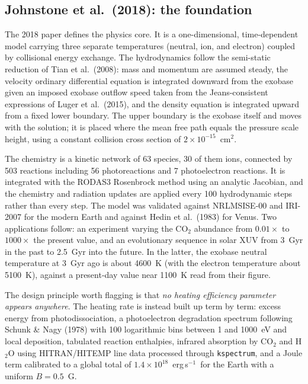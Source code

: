 \documentclass{my_memo}
\newcommand{\ergs}{erg\,s$^{-1}$}
\begin{document}
\subsection{Johnstone et al.\ (2018): the foundation}

The 2018 paper defines the physics core. It is a one-dimensional, time-dependent model carrying
three separate temperatures (neutral, ion, and electron) coupled by collisional energy
exchange. The hydrodynamics follow the semi-static reduction of Tian et al.\ (2008): mass and
momentum are assumed steady, the velocity ordinary differential equation is integrated downward
from the exobase given an imposed exobase outflow speed taken from the Jeans-consistent
expressions of Luger et al.\ (2015), and the density equation is integrated upward from a fixed
lower boundary. The upper boundary is the exobase itself and moves with the solution; it is
placed where the mean free path equals the pressure scale height, using a constant collision
cross section of $2\times10^{-15}$~cm$^{2}$.

The chemistry is a kinetic network of 63 species, 30 of them ions, connected by 503 reactions
including 56 photoreactions and 7 photoelectron reactions. It is integrated with the RODAS3
Rosenbrock method using an analytic Jacobian, and the chemistry and radiation updates are applied
every 100 hydrodynamic steps rather than every step. The model was validated against NRLMSISE-00
and IRI-2007 for the modern Earth and against Hedin et al.\ (1983) for Venus. Two applications
follow: an experiment varying the CO$_2$ abundance from $0.01\times$ to $1000\times$ the present
value, and an evolutionary sequence in solar XUV from 3~Gyr in the past to 2.5~Gyr into the
future. In the latter, the exobase neutral temperature at 3~Gyr ago is about 4600~K (with the
electron temperature about 5100~K), against a present-day value near 1100~K read from their
figure.

The design principle worth flagging is that \emph{no heating efficiency parameter appears
anywhere}. The heating rate is instead built up term by term: excess energy from photodissociation,
a photoelectron degradation spectrum following Schunk \& Nagy (1978) with 100 logarithmic bins
between 1 and 1000~eV and local deposition, tabulated reaction enthalpies, infrared absorption by
CO$_2$ and H$_2$O using HITRAN/HITEMP line data processed through \texttt{kspectrum}, and a Joule
term calibrated to a global total of $1.4\times10^{18}$~\ergs\ for the Earth with a uniform
$B = 0.5$~G.
\end{document}
